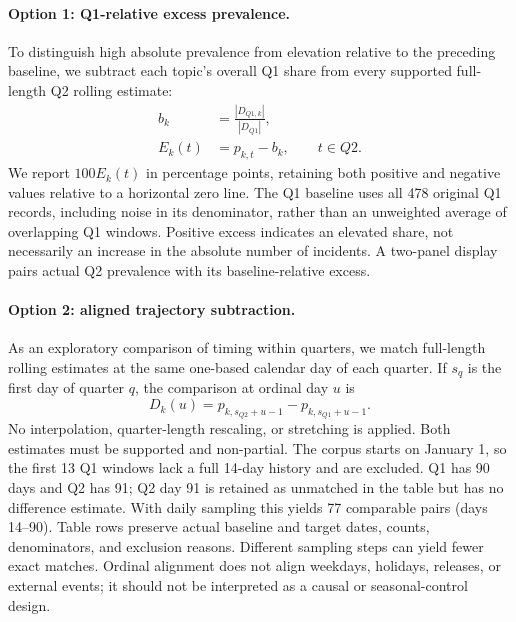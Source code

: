 \paragraph{Option 1: Q1-relative excess prevalence.}
To distinguish high absolute prevalence from elevation relative to the preceding baseline, we subtract each topic's overall Q1 share from every supported full-length Q2 rolling estimate:
\begin{equation}
\begin{aligned}
 b_k &= \frac{|D_{Q1,k}|}{|D_{Q1}|},\\
 E_k(t) &= p_{k,t}-b_k, \qquad t\in Q2.
\end{aligned}
\end{equation}
We report $100E_k(t)$ in percentage points, retaining both positive and negative values relative to a horizontal zero line. The Q1 baseline uses all 478 original Q1 records, including noise in its denominator, rather than an unweighted average of overlapping Q1 windows. Positive excess indicates an elevated share, not necessarily an increase in the absolute number of incidents. A two-panel display pairs actual Q2 prevalence with its baseline-relative excess.

\paragraph{Option 2: aligned trajectory subtraction.}
As an exploratory comparison of timing within quarters, we match full-length rolling estimates at the same one-based calendar day of each quarter. If $s_q$ is the first day of quarter $q$, the comparison at ordinal day $u$ is
\begin{equation}
 D_k(u)=p_{k,s_{Q2}+u-1}-p_{k,s_{Q1}+u-1}.
\end{equation}
No interpolation, quarter-length rescaling, or stretching is applied. Both estimates must be supported and non-partial. The corpus starts on January 1, so the first 13 Q1 windows lack a full 14-day history and are excluded. Q1 has 90 days and Q2 has 91; Q2 day 91 is retained as unmatched in the table but has no difference estimate. With daily sampling this yields 77 comparable pairs (days 14--90). Table rows preserve actual baseline and target dates, counts, denominators, and exclusion reasons. Different sampling steps can yield fewer exact matches. Ordinal alignment does not align weekdays, holidays, releases, or external events; it should not be interpreted as a causal or seasonal-control design.


